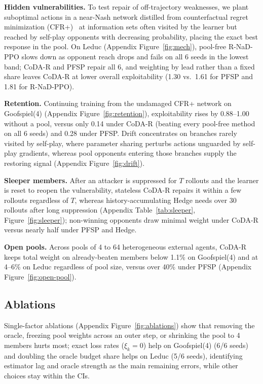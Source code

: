 \documentclass{article} %
\theoremstyle{plain}
\theoremstyle{remark}
\newcommand{\codar}{CoDA-R}
\newcommand{\rnad}{R-NaD-PPO}
\begin{document}
\textbf{Hidden vulnerabilities.} To test repair of off-trajectory weaknesses, we plant suboptimal actions in a near-Nash network distilled from counterfactual regret minimization (CFR+)~\citep{tammelin2014cfrplus} at information sets often visited by the learner but reached by self-play opponents with decreasing probability, placing the exact best response in the pool. On Leduc (Appendix Figure~\ref{fig:mech}), pool-free \rnad{} slows down as opponent reach drops and fails on all 6 seeds in the lowest band; \codar{} and PFSP repair all 6, and weighting by lead rather than a fixed share leaves \codar{} at lower overall exploitability (1.30 vs.\ 1.61 for PFSP and 1.81 for \rnad{}).

\textbf{Retention.} Continuing training from the undamaged CFR+ network on Goofspiel(4) (Appendix Figure~\ref{fig:retention}), exploitability rises by 0.88--1.00 without a pool, versus only 0.14 under \codar{} (beating every pool-free method on all 6 seeds) and 0.28 under PFSP. Drift concentrates on branches rarely visited by self-play, where parameter sharing perturbs actions unguarded by self-play gradients, whereas pool opponents entering those branches supply the restoring signal (Appendix Figure~\ref{fig:drift}).

\textbf{Sleeper members.} After an attacker is suppressed for $T$ rollouts and the learner is reset to reopen the vulnerability, stateless \codar{} repairs it within a few rollouts regardless of $T$, whereas history-accumulating Hedge needs over 30 rollouts after long suppression (Appendix Table~\ref{tab:sleeper}, Figure~\ref{fig:sleeper}); non-winning opponents draw minimal weight under \codar{} versus nearly half under PFSP and Hedge.

\textbf{Open pools.} Across pools of 4 to 64 heterogeneous external agents, \codar{} keeps total weight on already-beaten members below 1.1\% on Goofspiel(4) and at 4--6\% on Leduc regardless of pool size, versus over 40\% under PFSP (Appendix Figure~\ref{fig:open-pool}).

\subsection{Ablations}
\label{sec:exp-abl}

Single-factor ablations (Appendix Figure~\ref{fig:ablations}) show that removing the oracle, freezing pool weights across an outer step, or shrinking the pool to 4 members hurts most; exact loss rates ($\xi_k=0$) help on Goofspiel(4) (6/6 seeds) and doubling the oracle budget share helps on Leduc (5/6 seeds), identifying estimator lag and oracle strength as the main remaining errors, while other choices stay within the CIs.
\end{document}
